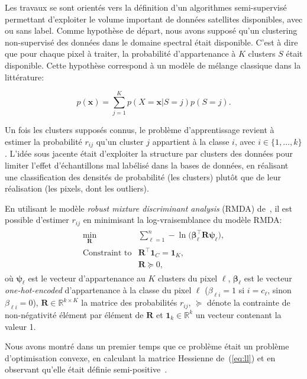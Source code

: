 Les travaux se sont orientés vers la définition d'un algorithmes semi-supervisé permettant d'exploiter le volume important de données satellites disponibles, avec ou sans label. Comme hypothèse de départ, nous avons supposé qu'un clustering non-supervisé des données dans le domaine spectral était disponible. C'est à dire que pour chaque pixel à traiter, la probabilité d'appartenance à \(K\) clusters \(S\) était disponible. Cette hypothèse correspond à un modèle de mélange classique dans la littérature:

\[p(\mathbf{x}) = \sum_{j=1}^Kp(X=\mathbf{x}|S=j)p(S=j).\]

Un fois les clusters supposés connus, le problème d'apprentissage revient à estimer la probabilité \(r_{ij}\) qu'un cluster \(j\) appartient à la classe \(i\), avec \(i\in\{1, \ldots,k\}\). L'idée sous jacente était d'exploiter la structure par clusters des données pour limiter l'effet d'échantillons mal labélisé dans la bases de données, en réalisant une classification des densités de probabilité (les clusters) plutôt que de leur réalisation (les pixels, dont les outliers).

En utilisant le modèle \emph{robust mixture discriminant analysis} (RMDA) de~\cite{bouveyron-2009-robus-super}, il est possible d'estimer \(r_{ij}\) en minimisant la log-vraisemblance du modèle RMDA:
\begin{eqnarray}
  \label{eq:ll}
  \begin{array}{rl}
    \displaystyle{\min_{\mathbf{R}}}
   &\displaystyle{\sum_{\ell=1}^n -\ln\big(\boldsymbol{\beta}_\ell^\top\mathbf{R}\boldsymbol{\psi}_\ell\big)},\\
   \text{Constraint to} & \mathbf{R}^\top\mathbf{1}_C = \mathbf{1}_K,\\
  & \mathbf{R} \succcurlyeq 0,
  \end{array}
\end{eqnarray}
où \(\boldsymbol{\psi}_\ell\) est le vecteur d'appartenance au \(K\) clusters du pixel \(\ell\), \(\boldsymbol{\beta}_\ell\) est le vecteur \emph{one-hot-encoded} d'appartenance à la classe du pixel \(\ell\) (\(\beta_{\ell i}=1\) si \(i=c_\ell\), sinon \(\beta_{\ell i}=0\)),  \(\mathbf{R}\in\mathbb{R}^{k\times K}\) la matrice des probabilités \(r_{ij}\), \(\succcurlyeq\) dénote la contrainte de non-négativité élément par élément de \(\mathbf{R}\) et \(\mathbf{1}_k\in\mathbb{R}^k\) un vecteur contenant la valeur 1.

Nous avons montré dans un premier temps que ce problème était un problème d'optimisation convexe, en calculant la matrice Hessienne de~(\ref{eq:ll}) et en observant qu'elle était définie semi-positive~\citep[Section~3.1]{GIRYFOUQUET2021320}.

